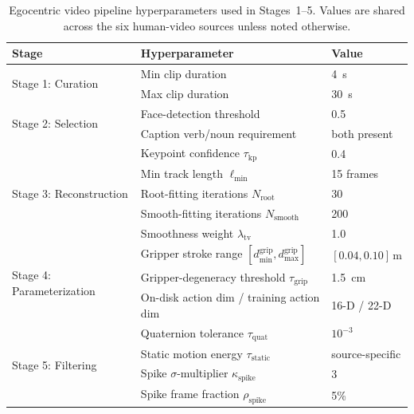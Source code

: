 \begin{table}[!t]
\centering
\small
\caption{Egocentric video pipeline hyperparameters used in Stages~1--5. Values are shared across the six human-video sources
unless noted otherwise.}
\label{tab:egocentric-pipeline-hparams}
\renewcommand{\arraystretch}{1.1}
\begin{tabular}{lll}
\toprule
\textbf{Stage} & \textbf{Hyperparameter} & \textbf{Value} \\
\midrule
\multirow[t]{2}{*}{Stage 1: Curation}
  & Min clip duration                               & 4~s \\
  & Max clip duration                               & 30~s \\
\midrule
\multirow[t]{2}{*}{Stage 2: Selection}
  & Face-detection threshold                        & 0.5 \\
  & Caption verb/noun requirement                   & both present \\
\midrule
\multirow[t]{5}{*}{Stage 3: Reconstruction}
  & Keypoint confidence $\tau_{\mathrm{kp}}$        & 0.4 \\
  & Min track length $\ell_{\min}$                  & 15 frames \\
  & Root-fitting iterations $N_{\mathrm{root}}$     & 30 \\
  & Smooth-fitting iterations $N_{\mathrm{smooth}}$ & 200 \\
  & Smoothness weight $\lambda_{\mathrm{tv}}$       & 1.0 \\
\midrule
\multirow[t]{3}{*}{Stage 4: Parameterization}
  & Gripper stroke range $[d_{\min}^{\mathrm{grip}}, d_{\max}^{\mathrm{grip}}]$ & $[0.04, 0.10]\,\mathrm{m}$ \\
  & Gripper-degeneracy threshold $\tau_{\mathrm{grip}}$ & 1.5~cm \\
  & On-disk action dim / training action dim        & 16-D / 22-D \\
\midrule
\multirow[t]{4}{*}{Stage 5: Filtering}
  & Quaternion tolerance $\tau_{\mathrm{quat}}$     & $10^{-3}$ \\
  & Static motion energy $\tau_{\mathrm{static}}$   & source-specific \\
  & Spike $\sigma$-multiplier $\kappa_{\mathrm{spike}}$ & 3 \\
  & Spike frame fraction $\rho_{\mathrm{spike}}$    & 5\% \\
\bottomrule
\end{tabular}
\end{table}

